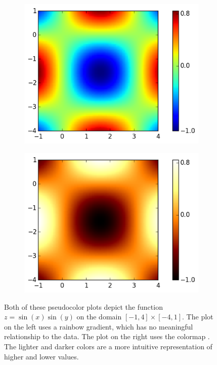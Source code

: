 \begin{figure}[h]
\centering
\begin{subfigure}{.5\textwidth}
  \centering
  \includegraphics[width=\textwidth]{heatmap_color.png}
\end{subfigure}%
\begin{subfigure}{.5\textwidth}
  \centering
  \includegraphics[width=\textwidth]{heatmap_hot.png}
\end{subfigure}
\caption{Both of these pseudocolor plots depict the function
	$z = \sin(x)\sin(y)$ on the domain $[-1,4] \times [-4,1]$. 
The plot on the left uses a rainbow gradient, which has no meaningful relationship to the data. 
The plot on the right uses the colormap .  The lighter and darker colors are a more intuitive
representation of higher and lower values.}

\label{fig:heatmap}
\end{figure}

